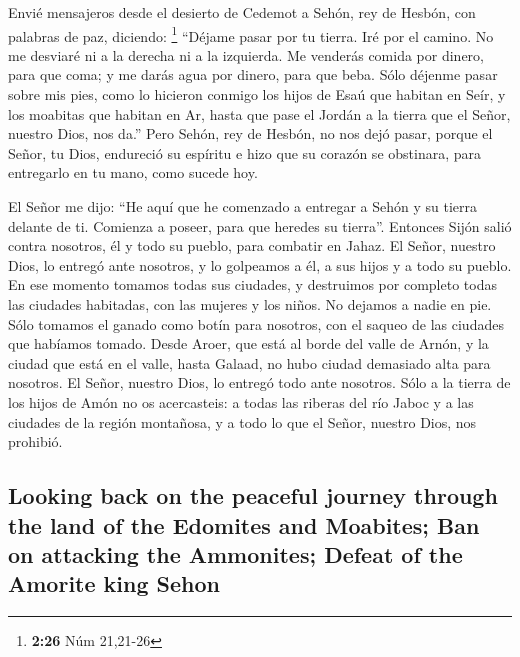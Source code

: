 \begin{paracol}{2}
 Envié mensajeros desde el desierto de Cedemot a Sehón,
rey de Hesbón, con palabras de paz, diciendo: \footnote{\textbf{2:26}
  Núm 21,21-26}  ``Déjame pasar por tu tierra. Iré por el
camino. No me desviaré ni a la derecha ni a la izquierda.
 Me venderás comida por dinero, para que coma; y me darás
agua por dinero, para que beba. Sólo déjenme pasar sobre mis pies,
 como lo hicieron conmigo los hijos de Esaú que habitan
en Seír, y los moabitas que habitan en Ar, hasta que pase el Jordán a la
tierra que el Señor, nuestro Dios, nos da.''  Pero Sehón,
rey de Hesbón, no nos dejó pasar, porque el Señor, tu Dios, endureció su
espíritu e hizo que su corazón se obstinara, para entregarlo en tu mano,
como sucede hoy.

 El Señor me dijo: ``He aquí que he comenzado a entregar
a Sehón y su tierra delante de ti. Comienza a poseer, para que heredes
su tierra''.  Entonces Sijón salió contra nosotros, él y
todo su pueblo, para combatir en Jahaz.  El Señor,
nuestro Dios, lo entregó ante nosotros, y lo golpeamos a él, a sus hijos
y a todo su pueblo.  En ese momento tomamos todas sus
ciudades, y destruimos por completo todas las ciudades habitadas, con
las mujeres y los niños. No dejamos a nadie en pie.  Sólo
tomamos el ganado como botín para nosotros, con el saqueo de las
ciudades que habíamos tomado.  Desde Aroer, que está al
borde del valle de Arnón, y la ciudad que está en el valle, hasta
Galaad, no hubo ciudad demasiado alta para nosotros. El Señor, nuestro
Dios, lo entregó todo ante nosotros.  Sólo a la tierra de
los hijos de Amón no os acercasteis: a todas las riberas del río Jaboc y
a las ciudades de la región montañosa, y a todo lo que el Señor, nuestro
Dios, nos prohibió.

\switchcolumn
\begin{otherlanguage}{english}

\hypertarget{looking-back-on-the-peaceful-journey-through-the-land-of-the-edomites-and-moabites-ban-on-attacking-the-ammonites-defeat-of-the-amorite-king-sehon}{%
\subsection{Looking back on the peaceful journey through the land of the
Edomites and Moabites; Ban on attacking the Ammonites; Defeat of the
Amorite king
Sehon}\label{looking-back-on-the-peaceful-journey-through-the-land-of-the-edomites-and-moabites-ban-on-attacking-the-ammonites-defeat-of-the-amorite-king-sehon}}


\end{otherlanguage}
\end{paracol}
